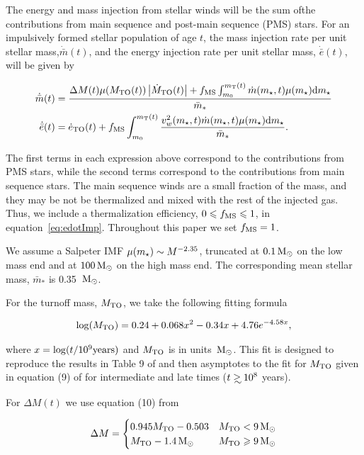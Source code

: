 The energy and mass injection from stellar winds will be the sum ofthe
contributions from main sequence and post-main sequence (PMS) stars.
For an impulsively formed stellar population of age $t$, the mass
injection rate per unit stellar mass,$\dot{\bar{m}}(t)$, and  the energy
injection rate per unit stellar mass, $\dot{\bar{e}}(t)$,  will be given by

\begin{align} 
  \dot{\bar{m}}(t) &= \frac{\Delta M(t) \mu(M_{\rm TO}(t))
    \left|\dot{M}_{\rm TO}(t)\right| + f_{\rm MS} \int_{m_0}^{m_{\rm
        T}(t)}
    \dot{m}(\Mstar, t) \mu(\Mstar) {\rm d}\Mstar }{\bar{m}_*}\\
  \dot{\bar{e}}(t) &=\dot{e}_{\rm TO}(t)+ f_{\rm MS} \int_{m_0}^{m_{\rm T}(t)}
  \frac{\vw^2(\Mstar, t) \dot{m}(\Mstar, t) \mu(\Mstar) {\rm d}\Mstar}{\bar{m}_*}.
  \label{eq:edotImp}
\end{align} 

The first terms in each expression above correspond to the
contributions from PMS stars, while the second terms correspond to the
contributions from main sequence stars. The main sequence winds are a
small fraction of the mass, and they may be not be thermalized and
mixed with the rest of the injected gas. Thus, we include a
thermalization efficiency, $ 0\le f_{\rm MS}\le 1$, in
equation~\eqref{eq:edotImp}. Throughout this paper we set $f_{\rm
  MS}=1$. 

We assume a Salpeter IMF $\mu(\Mstar)\sim M^{-2.35}$, truncated at $0.1
\Msun$ on the low mass end and at $100 \Msun$ on the high mass
end. The corresponding mean stellar mass, $\bar{m}_*$ is 0.35 $\Msun$.

For the turnoff mass, $M_{\rm TO}$, we take the following fitting
formula 

\begin{align}
\log(M_{\rm TO})=0.24 + 0.068 x^2-0.34 x+4.76 e^{-4.58 x},
\end{align}

where $x=\log(t/10^9 {\rm years})$ and $M_{\rm TO}$ is in units
$\Msun$. This fit is designed to reproduce the results in 
Table 9 of \citet{MaederMeynet:1987a} and then asymptotes to the fit
for $M_{\rm TO}$ given in equation (9) of \citet{CiottiOstriker:2007a}
for intermediate and late times ($t \gsim 10^8$ years).

For $\Delta M(t)$ we use equation (10) from \citet{CiottiOstriker:2007a}

\begin{align}
\Delta M=
\begin{cases}
0.945 M_{\rm TO}-0.503 & M_{\rm TO} < 9 \Msun\\
 M_{\rm TO}-1.4 \Msun &  M_{\rm TO} \ge 9 \Msun
\end{cases}
\end{align}

